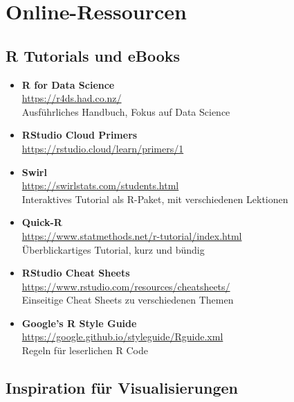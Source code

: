 \documentclass[11pt,german,a4paper]{article}
\begin{document}
\hypertarget{online-ressourcen}{%
\section*{Online-Ressourcen}\label{online-ressourcen}}

\hypertarget{r-tutorials-und-ebooks}{%
\subsection*{R Tutorials und eBooks}\label{r-tutorials-und-ebooks}}

\begin{itemize}
\item
  \textbf{R for Data Science}\\
  \url{https://r4ds.had.co.nz/}~\\
  Ausführliches Handbuch, Fokus auf Data Science
\item
  \textbf{RStudio Cloud Primers}\\
  \url{https://rstudio.cloud/learn/primers/1}
\item
  \textbf{Swirl}\\
  \url{https://swirlstats.com/students.html}~\\
  Interaktives Tutorial als R-Paket, mit verschiedenen Lektionen
\item
  \textbf{Quick-R}\\
  \url{https://www.statmethods.net/r-tutorial/index.html}~\\
  Überblickartiges Tutorial, kurz und bündig
\item
  \textbf{RStudio Cheat Sheets}\\
  \url{https://www.rstudio.com/resources/cheatsheets/}~\\
  Einseitige Cheat Sheets zu verschiedenen Themen
\item
  \textbf{Google's R Style Guide}\\
  \url{https://google.github.io/styleguide/Rguide.xml}~\\
  Regeln für leserlichen R Code
\end{itemize}

\hypertarget{inspiration-fuxfcr-visualisierungen}{%
\subsection*{Inspiration für Visualisierungen}\label{inspiration-fuxfcr-visualisierungen}}
\end{document}
